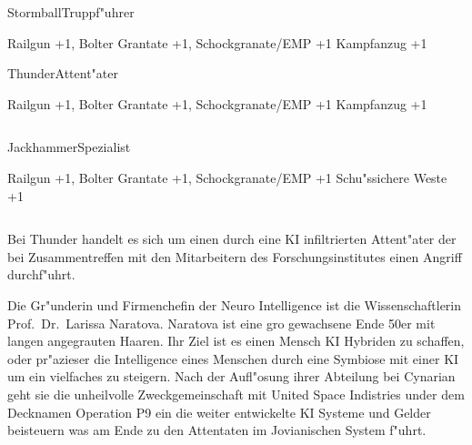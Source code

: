\begin{column}[l]{0.45}
    \begin{nscsheet}[h]{Stormball\newline{}Truppf"uhrer}
        \nscstats[ATT=3,AGG=3,CON=2]
        \nscruler
        \begin{nscinventory}
            \nscitem[Waffen] Railgun +1, Bolter
            \nscitem[Granaten] Grantate +1, Schockgranate/EMP +1
            \nscitem[R"ustung] Kampfanzug +1
        \end{nscinventory}
    \end{nscsheet}

    \begin{nscsheet}[h]{Thunder\newline{}Attent"ater}
        \nscstats[ATT=3,AGG=3,CON=2]
        \nscruler
        \begin{nscinventory}
            \nscitem[Waffen] Railgun +1, Bolter
            \nscitem[Granaten] Grantate +1, Schockgranate/EMP +1
            \nscitem[R"ustung] Kampfanzug +1
        \end{nscinventory}
    \end{nscsheet}
\end{column}
\begin{column}[r]{0.45}
    \begin{nscsheet}[h]{Jackhammer\newline{}Spezialist}
        \nscstats[ATT=2,AGG=2,DEX=3,CON=2]
        \nscruler
        \begin{nscinventory}
            \nscitem[Waffen] Railgun +1, Bolter
            \nscitem[Granaten] Grantate +1, Schockgranate/EMP +1
            \nscitem[R"ustung] Schu"ssichere Weste +1
        \end{nscinventory}
    \end{nscsheet}
\end{column}

\medskip
Bei Thunder handelt es sich um einen durch eine KI infiltrierten Attent"ater der bei Zusammentreffen mit den 
Mitarbeitern des Forschungsinstitutes einen Angriff durchf"uhrt.

\renewcommand{\ml}{\pinyin{Mailin2}}


Die Gr"underin und Firmenchefin der Neuro Intelligence ist die Wissenschaftlerin Prof.~Dr.~Larissa Naratova. Naratova ist eine gro\3 gewachsene Ende 50er mit langen angegrauten Haaren. Ihr Ziel ist es einen Mensch KI Hybriden zu schaffen, oder pr"azieser die Intelligence eines Menschen durch eine Symbiose mit einer KI um ein vielfaches zu steigern. Nach der Aufl"osung ihrer Abteilung bei Cynarian geht sie die unheilvolle Zweckgemeinschaft mit United Space Indistries under dem Decknamen Operation P9 ein die weiter entwickelte KI Systeme und Gelder beisteuern was am Ende zu den Attentaten im Jovianischen System f"uhrt.

